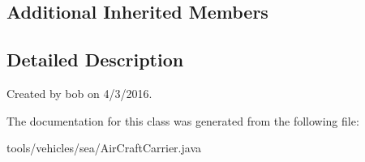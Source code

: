 \subsection*{Additional Inherited Members}


\subsection{Detailed Description}
Created by bob on 4/3/2016. 

The documentation for this class was generated from the following file\+:\begin{DoxyCompactItemize}
\item 
tools/vehicles/sea/Air\+Craft\+Carrier.\+java\end{DoxyCompactItemize}
